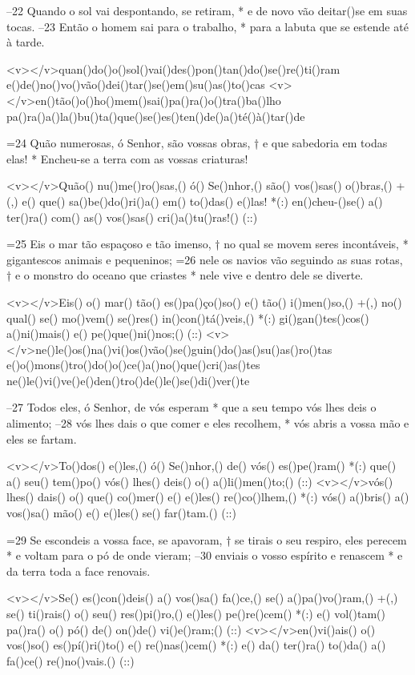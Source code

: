 –22 Quando o sol vai despontando, se retiram, *
e de novo vão deitar()se em suas tocas.
–23 Então o homem sai para o trabalho, *
para a labuta que se estende até à tarde.

<v></v>quan()do()o()sol()vai()des()pon()tan()do()se()re()ti()ram
e()de()no()vo()vão()dei()tar()se()em()su()as()to()cas
<v></v>en()tão()o()ho()mem()sai()pa()ra()o()tra()ba()lho
pa()ra()a()la()bu()ta()que()se()es()ten()de()a()té()à()tar()de

=24 Quão numerosas, ó Senhor, são vossas obras, †
e que sabedoria em todas elas! *
Encheu-se a terra com as vossas criaturas!

<v></v>Quão() nu()me()ro()sas,() ó() Se()nhor,() são() vos()sas() o()bras,() +(,)
e() que() sa()be()do()ri()a() em() to()das() e()las! *(:)
en()cheu-()se() a() ter()ra() com() as() vos()sas() cri()a()tu()ras!() (::)

=25 Eis o mar tão espaçoso e tão imenso, †
no qual se movem seres incontáveis, *
gigantescos animais e pequeninos;
=26 nele os navios vão seguindo as suas rotas, †
e o monstro do oceano que criastes *
nele vive e dentro dele se diverte.

<v></v>Eis() o() mar() tão() es()pa()ço()so() e() tão() i()men()so,() +(,)
no() qual() se() mo()vem() se()res() in()con()tá()veis,() *(:)
gi()gan()tes()cos() a()ni()mais() e() pe()que()ni()nos;() (::)
<v></v>ne()le()os()na()vi()os()vão()se()guin()do()as()su()as()ro()tas
e()o()mons()tro()do()o()ce()a()no()que()cri()as()tes
ne()le()vi()ve()e()den()tro()de()le()se()di()ver()te

–27 Todos eles, ó Senhor, de vós esperam *
que a seu tempo vós lhes deis o alimento;
–28 vós lhes dais o que comer e eles recolhem, *
vós abris a vossa mão e eles se fartam.

<v></v>To()dos() e()les,() ó() Se()nhor,() de() vós() es()pe()ram() *(:)
que() a() seu() tem()po() vós() lhes() deis() o() a()li()men()to;() (::)
<v></v>vós() lhes() dais() o() que() co()mer() e() e()les() re()co()lhem,() *(:)
vós() a()bris() a() vos()sa() mão() e() e()les() se() far()tam.() (::)

=29 Se escondeis a vossa face, se apavoram, †
se tirais o seu respiro, eles perecem *
e voltam para o pó de onde vieram;
–30 enviais o vosso espírito e renascem *
e da terra toda a face renovais.

<v></v>Se() es()con()deis() a() vos()sa() fa()ce,() se() a()pa()vo()ram,() +(,)
se() ti()rais() o() seu() res()pi()ro,() e()les() pe()re()cem() *(:)
e() vol()tam() pa()ra() o() pó() de() on()de() vi()e()ram;() (::)
<v></v>en()vi()ais() o() vos()so() es()pí()ri()to() e() re()nas()cem() *(:)
e() da() ter()ra() to()da() a() fa()ce() re()no()vais.() (::)

